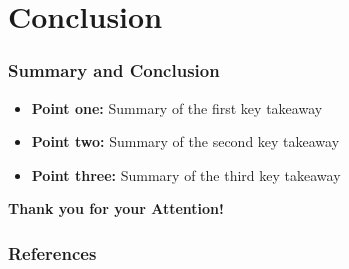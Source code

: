 \documentclass[aspectratio=169]{beamer}
\begin{document}

\section{Conclusion}

\begin{frame}
  \frametitle{Summary and Conclusion}
  \begin{itemize}
    \item[\checkmark] \textbf{Point one:} Summary of the first key takeaway
    \item[\checkmark] \textbf{Point two:} Summary of the second key takeaway
    \item[\checkmark] \textbf{Point three:} Summary of the third key takeaway
  \end{itemize}
  
  \vspace{1.5cm}
  
  \begin{center}
    \textcolor{RWTHblue}{\Large \textbf{Thank you for your Attention!}}
  \end{center}
\end{frame}


\begin{frame}[allowframebreaks]
  \frametitle{References}
  \nocite{*}
  \printbibliography[heading=none]
\end{frame}
\end{document}
